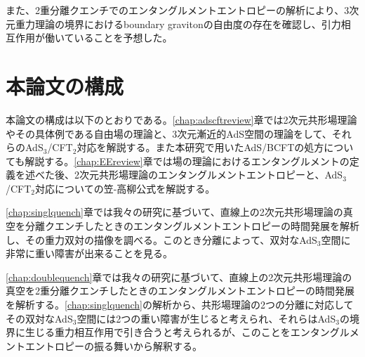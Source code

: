 また、2重分離クエンチでのエンタングルメントエントロピーの解析により、3次元重力理論の境界におけるboundary gravitonの自由度の存在を確認し、引力相互作用が働いていることを予想した。

\section*{本論文の構成}
本論文の構成は以下のとおりである。\ref{chap:adscftreview}章では2次元共形場理論やその具体例である自由場の理論と、3次元漸近的AdS空間の理論をして、それらのAdS$_3$/CFT$_2$対応を解説する。また本研究で用いたAdS/BCFTの処方についても解説する。\ref{chap:EEreview}章では場の理論におけるエンタングルメントの定義を述べた後、2次元共形場理論のエンタングルメントエントロピーと、AdS$_3$/CFT$_2$対応についての笠-高柳公式を解説する。

\ref{chap:singlquench}章では我々の研究\cite{Shimaji:2018czt}に基づいて、直線上の2次元共形場理論の真空を分離クエンチしたときのエンタングルメントエントロピーの時間発展を解析し、その重力双対の描像を調べる。このとき分離によって、双対なAdS$_3$空間に非常に重い障害が出来ることを見る。

\ref{chap:doublequench}章では我々の研究\cite{Caputa:2019avh}に基づいて、直線上の2次元共形場理論の真空を2重分離クエンチしたときのエンタングルメントエントロピーの時間発展を解析する。\ref{chap:singlquench}の解析から、共形場理論の2つの分離に対応してその双対なAdS$_3$空間には2つの重い障害が生じると考えられ、それらはAdS$_3$の境界に生じる重力相互作用で引き合うと考えられるが、このことをエンタングルメントエントロピーの振る舞いから解釈する。
